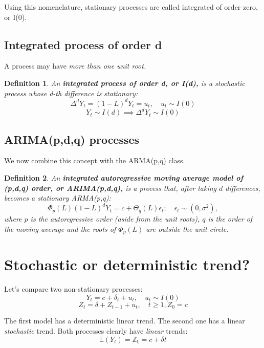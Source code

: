 \documentclass[11pt, a4paper]{report}
\theoremstyle{plain}
\theoremstyle{plain}
\newtheorem{defn}{Definition}[section]
\theoremstyle{remark}
\begin{document}
Using this nomenclature, stationary processes are called integrated of order zero, or I(0).

\subsection{Integrated process of order d}

A process may have \textit{more than one unit root.} 

\begin{defn}
	An \textbf{integrated process of order d, or I(d),} is a stochastic process whose d-th difference is stationary:
	$$ \Delta^d Y_t = (1-L)^d Y_t = u_t, \hspace{1em} u_t \sim I(0) $$
	$$ Y_t \sim I(d) \implies \Delta^d Y_t \sim I(0) $$
\end{defn}

\subsection{ARIMA(p,d,q) processes}

We now combine this concept with the ARMA(p,q) class.

\begin{defn}
	An \textbf{integrated autoregressive moving average model of (p,d,q) order, or ARIMA(p,d,q),} is a process that, after taking $d$ differences, becomes a stationary ARMA(p,q):
	$$\Phi_{p}(L)(1-L)^{d} Y_{t}=c+\Theta_{q}(L) \epsilon_{t} ; \quad \epsilon_{t} \sim\left(0, \sigma^{2}\right),$$
	where $p$ is the autoregressive order (aside from the unit roots), $q$ is the order of the moving average and the roots of $\Phi_{p}(L)$ are outside the unit circle.
\end{defn}

\section{Stochastic or deterministic trend?}

Let's compare two non-stationary processes:
$$ Y_t = c + \delta_{t} + u_t, \hspace{1em} u_t \sim I(0) $$
$$ Z_t = \delta + Z_{t-1} + u_t, \hspace{1em} t \geq 1, Z_0 = c$$

The first model has a deterministic linear trend. The second one has a linear \textit{stochastic} trend. Both processes clearly have \textit{linear} trends:
$$ \mathbb{E}(Y_t) = \mathbb{Z_t} = c + \delta t $$
\end{document}
